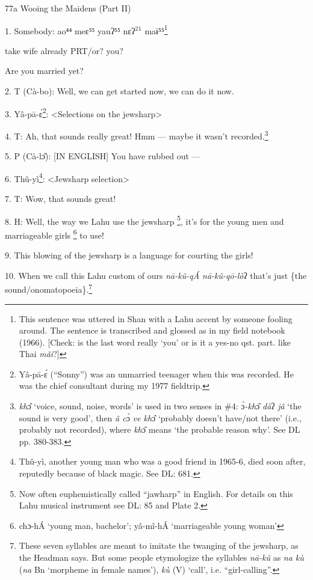 
77a Wooing the Maidens (Part II)

1. Somebody:  ao⁴⁴ meɛ⁵⁵ yauʔ⁵⁵ nɛʔ\ensuremath{^2}\ensuremath{^1}  maɨ⁵⁵\footnote{This sentence was uttered in Shan with a Lahu accent by someone fooling around. The sentence is transcribed and glossed as in my field notebook (1966). [Check: is the last word really `you' or is it a yes-no qst. part. like Thai \textit{mǎi}?]}

take wife already PRT/or? you?

Are you married yet?

2. T (Cà-bo): Well, we can get started now, we can do it now.

3. Yâ-pā-ɛ́\footnote{Yâ-pā-ɛ́ (``Sonny'') was an unmarried teenager when this was recorded. He was the chief consultant during my 1977 fieldtrip.}: <Selections on the jewsharp>

4. T: Ah, that sounds really great! Hmm --- maybe it wasn't recorded.\footnote{\textit{kh}ɔ̂ `voice, sound, noise, words' is used in two senses in \#4: ɔ̀\textit{-kh}ɔ̂\textit{ dà}ʔ\textit{ jâ} `the sound is very good', then \textit{â c}ɔ̀\textit{ ve kh}ɔ̂ `probably doesn't have/not there' (i.e., probably not recorded), where \textit{kh}ɔ̂ means `the probable reason why'. See DL pp. 380-383.}

5. P (Cà-lɔ̂): [IN ENGLISH] You have rubbed out ---

6. Thû-yì\footnote{Thû-yì, another young man who was a good friend in 1965-6, died soon after, reputedly because of black magic. See DL: 681.}: <Jewsharp selection>

7. T: Wow, that sounds great!

8. H: Well, the way we Lahu use the jewsharp \footnote{Now often euphemistically called ``jawharp'' in English. For details on this Lahu musical instrument see DL: 85 and Plate 2.}, it's for the young men and marriageable
girls \footnote{chɔ-hÁ `young man, bachelor'; yâ-mî-hÁ `marriageable young woman'} to use!

9. This blowing of the jewsharp is a language for courting the girls!

10. When we call this Lahu custom of ours \textit{nā-kû-qÁ nā-kû-qō-lò}ʔ
that's just \{the sound/onomatopoeia\}.\footnote{These seven syllables are meant to imitate the twanging of the jewsharp, as the Headman says. But some people etymologize the syllables \textit{nā-kû }as \textit{na kù} (\textit{na} Bn `morpheme in female names'), \textit{kù} (V) `call', i.e. ``girl-calling''.}

